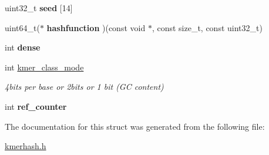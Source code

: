 \begin{DoxyCompactItemize}
\mbox{\label{structkmer__params__struct_a77f5eb77679070522873aaa03a755556}} 
uint32\+\_\+t {\bfseries seed} \mbox{[}14\mbox{]}
\item 
\mbox{\label{structkmer__params__struct_a5ea059ef3fcd9b26afc606f5dcc56f11}} 
uint64\+\_\+t($\ast$ {\bfseries hashfunction} )(const void $\ast$, const size\+\_\+t, const uint32\+\_\+t)
\item 
\mbox{\label{structkmer__params__struct_a69d70574b05a23738d7bc513506a5f55}} 
int {\bfseries dense}
\item 
\mbox{\label{structkmer__params__struct_a6802863a0456220728dbc871b3231f41}} 
int \hyperlink{structkmer__params__struct_a6802863a0456220728dbc871b3231f41}{kmer\+\_\+class\+\_\+mode}
\begin{DoxyCompactList}\small\item\em 4bits per base or 2bits or 1 bit (GC content) \end{DoxyCompactList}\item 
\mbox{\label{structkmer__params__struct_a55fd86af1c62c75de5e275d69a83bcc7}} 
int {\bfseries ref\+\_\+counter}
\end{DoxyCompactItemize}


The documentation for this struct was generated from the following file\+:\begin{DoxyCompactItemize}
\item 
\hyperlink{kmerhash_8h}{kmerhash.\+h}\end{DoxyCompactItemize}
